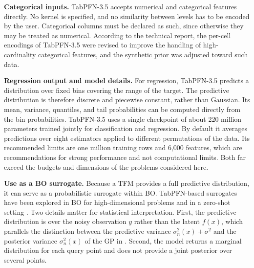 \textbf{Categorical inputs.} TabPFN-3.5 accepts numerical and categorical features directly. No kernel is specified, and no similarity between levels has to be encoded by the user. Categorical columns must be declared as such, since otherwise they may be treated as numerical. According to the technical report, the per-cell encodings of TabPFN-3.5 were revised to improve the handling of high-cardinality categorical features, and the synthetic prior was adjusted toward such data. %

\textbf{Regression output and model details.} For regression, TabPFN-3.5 predicts a distribution over fixed bins covering the range of the target. The predictive distribution is therefore discrete and piecewise constant, rather than Gaussian. Its mean, variance, quantiles, and tail probabilities can be computed directly from the bin probabilities. TabPFN-3.5 uses a single checkpoint of about 220 million parameters trained jointly for classification and regression. By default it averages predictions over eight estimators applied to different permutations of the data. Its recommended limits are one million training rows and 6,000 features, which are recommendations for strong performance and not computational limits. Both far exceed the budgets and dimensions of the problems considered here.

\textbf{Use as a BO surrogate.} Because a TFM provides a full predictive distribution, it can serve as a probabilistic surrogate within BO. TabPFN-based surrogates have been explored in BO for high-dimensional problems \citep{ICLR2026_b54bafb9} and in a zero-shot setting \citep{Rogers2026}. Two details matter for statistical interpretation. First, the predictive distribution is over the noisy observation $y$ rather than the latent $f(x)$, which parallels the distinction between the predictive variance $\sigma_n^2(x) + \sigma^2$ and the posterior variance $\sigma_n^2(x)$ of the GP in . Second, the model returns a marginal distribution for each query point and does not provide a joint posterior over several points.

